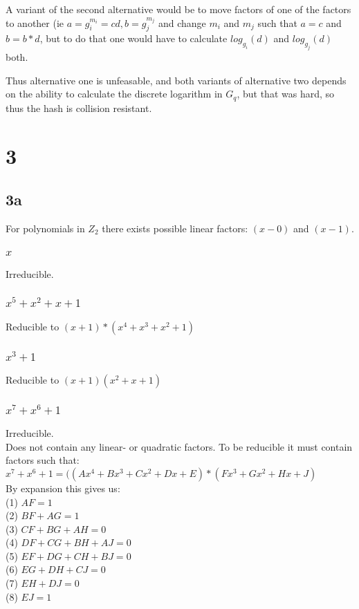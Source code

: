\documentclass[a4paper,11pt]{article}
\begin{document}
		A variant of the second alternative would be to move factors of one of the factors to another (ie $a = g_i^{m_i} = cd, b = g_j^{m_j}$ and
		change $m_i$ and $m_j$ such that $a = c$ and $b = b*d$, but to do that one would have to calculate $log_{g_i}(d)$ and $log_{g_j}(d)$ both.

		Thus alternative one is unfeasable, and both variants of alternative two depends on the ability to calculate the discrete logarithm
		in $G_q$, but that was hard, so thus the hash is collision resistant.

	\section*{3 }
		\subsection*{3a }
			For polynomials in $Z_2$ there exists possible linear factors: $(x-0)$ and $(x-1)$.

			\subsubsection*{$x$}
				Irreducible.
			\subsubsection*{$x^5 + x^2 + x + 1$}
				Reducible to $(x + 1)*(x^4 + x^3 + x^2 + 1)$
			\subsubsection*{$x^3 + 1$}
				Reducible to $(x + 1)(x^2 + x + 1)$
			\subsubsection*{$x^7 + x^6 + 1$}
				Irreducible.\\
				Does not contain any linear- or quadratic factors. To be reducible it must contain factors such that:\\
				$x^7 + x^6 + 1 = ((Ax^4 + Bx^3 + Cx^2 + Dx + E) * (Fx^3 + Gx^2 + Hx + J)$\\
				By expansion this gives us:\\
				(1) $AF = 1$\\
				(2) $BF + AG = 1$\\
				(3) $CF + BG + AH = 0$\\
				(4) $DF + CG + BH + AJ = 0$\\
				(5) $EF + DG + CH + BJ = 0$\\
				(6) $EG + DH + CJ = 0$\\
				(7) $EH + DJ = 0$\\
				(8) $EJ = 1$\\
		
\end{document}
